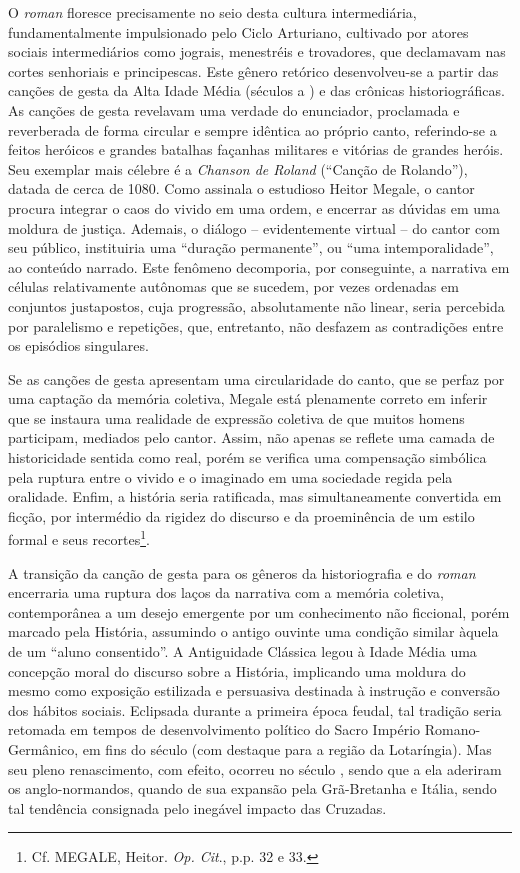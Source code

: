 O \textit{roman }floresce precisamente no seio desta cultura intermediária,
fundamentalmente impulsionado pelo Ciclo Arturiano, cultivado por atores
sociais intermediários como jograis, menestréis e trovadores, que declamavam
nas cortes senhoriais e principescas. Este gênero retórico desenvolveu-se a
partir das canções de gesta da Alta Idade Média (séculos  a ) e das
crônicas historiográficas. As canções de gesta revelavam uma verdade do
enunciador, proclamada e reverberada de forma circular e sempre idêntica ao
próprio canto, referindo-se a feitos heróicos e grandes batalhas façanhas
militares e vitórias de grandes heróis. Seu exemplar mais célebre é a
\textit{Chanson de Roland} (“Canção de Rolando”), datada de cerca de  1080.
Como assinala o estudioso Heitor Megale, o cantor procura integrar o caos do
vivido em uma ordem, e encerrar as dúvidas em uma moldura de justiça. Ademais,
o diálogo -- evidentemente virtual -- do cantor com seu público, instituiria uma
“duração permanente”, ou “uma intemporalidade”, ao conteúdo narrado. Este
fenômeno decomporia, por conseguinte, a narrativa em células relativamente
autônomas que se sucedem, por vezes ordenadas em conjuntos justapostos, cuja
progressão, absolutamente não linear, seria percebida por paralelismo e
repetições, que, entretanto, não desfazem as contradições entre os episódios
singulares.

Se as canções de gesta apresentam uma circularidade do canto, que se perfaz por
uma captação da memória coletiva, Megale está plenamente correto em inferir que
se instaura uma realidade de expressão coletiva de que muitos homens
participam, mediados pelo cantor. Assim, não apenas se reflete uma camada de
historicidade sentida como real, porém se verifica uma compensação simbólica
pela ruptura entre o vivido e o imaginado em uma sociedade regida pela
oralidade. Enfim, a história seria ratificada, mas  simultaneamente convertida
em ficção, por intermédio da rigidez do discurso e da proeminência de um estilo
formal e seus recortes\footnote{ Cf. MEGALE, Heitor. \textit{Op. Cit}., p.p. 32
e 33. }.

 A transição da canção de gesta para os gêneros da historiografia e do
\textit{roman} encerraria uma ruptura dos laços da narrativa com a memória
coletiva, contemporânea a um desejo emergente por um conhecimento não
ficcional, porém marcado pela História, assumindo o antigo ouvinte uma condição
similar àquela de um “aluno consentido”. A  Antiguidade Clássica legou à Idade
Média uma concepção moral do discurso sobre a História, implicando uma moldura
do mesmo como exposição estilizada e persuasiva destinada à instrução e
conversão dos hábitos sociais. Eclipsada durante a primeira época feudal, tal
tradição seria retomada em tempos de desenvolvimento político do Sacro Império
Romano-Germânico, em fins do século  (com destaque para a região da
Lotaríngia). Mas seu pleno renascimento, com efeito, ocorreu no século ,
sendo que a ela aderiram os anglo-normandos, quando de sua expansão pela
Grã-Bretanha e Itália, sendo tal tendência consignada pelo inegável impacto das
Cruzadas. 

